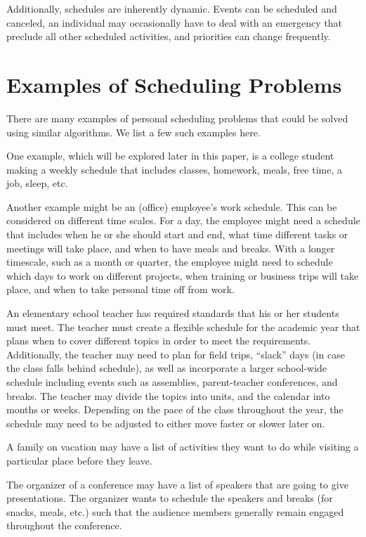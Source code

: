 \documentclass{article}
\newcommand{\todo}[1]{}
\begin{document}
	Additionally, schedules are inherently dynamic.
	Events can be scheduled and canceled, an individual may occasionally have to deal with an emergency that preclude all other scheduled activities, and priorities can change frequently.
	\todo{expand this section}

 \section{Examples of Scheduling Problems}
 	There are many examples of personal scheduling problems that could be solved using similar algorithms. We list a few such examples here.

 	One example, which will be explored later in this paper, is a college student making a weekly schedule that includes classes, homework, meals, free time, a job, sleep, etc.

 	Another example might be an (office) employee's work schedule. This can be considered on different time scales. For a day, the employee might need a schedule that includes when he or she should start and end, what time different tasks or meetings will take place, and when to have meals and breaks. With a longer timescale, such as a month or quarter, the employee might need to schedule which days to work on different projects, when training or business trips will take place, and when to take personal time off from work.

 	An elementary school teacher has required standards that his or her students must meet. The teacher must create a flexible schedule for the academic year that plans when to cover different topics in order to meet the requirements. Additionally, the teacher may need to plan for field trips, ``slack'' days (in case the class falls behind schedule), as well as incorporate a larger school-wide schedule including events such as assemblies, parent-teacher conferences, and breaks. The teacher may divide the topics into units, and the calendar into months or weeks. Depending on the pace of the class throughout the year, the schedule may need to be adjusted to either move faster or slower later on.

 	A family on vacation may have a list of activities they want to do while visiting a particular place before they leave.

 	The organizer of a conference may have a list of speakers that are going to give presentations. The organizer wants to schedule the speakers and breaks (for snacks, meals, etc.) such that the audience members generally remain engaged throughout the conference.
 	
\end{document}
